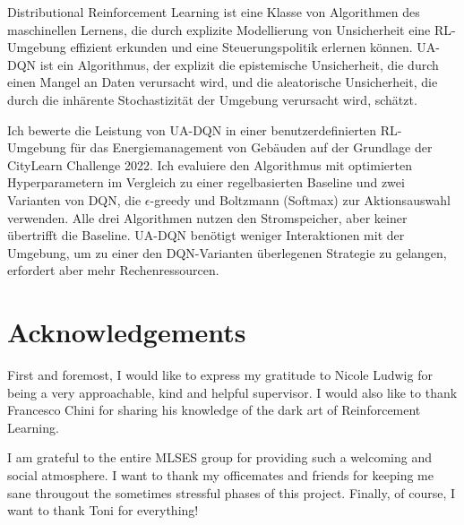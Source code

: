 \documentclass[oneside,12pt,a4paper]{report}
\begin{document}
Distributional Reinforcement Learning ist eine Klasse von Algorithmen des maschinellen Lernens, die durch explizite Modellierung von Unsicherheit eine RL-Umgebung effizient erkunden und eine Steuerungspolitik erlernen können.
UA-DQN ist ein Algorithmus, der explizit die epistemische Unsicherheit, die durch einen Mangel an Daten verursacht wird, und die aleatorische Unsicherheit, die durch die inhärente Stochastizität der Umgebung verursacht wird, schätzt.

Ich bewerte die Leistung von UA-DQN in einer benutzerdefinierten RL-Umgebung für das Energiemanagement von Gebäuden auf der Grundlage der CityLearn Challenge 2022.
Ich evaluiere den Algorithmus mit optimierten Hyperparametern im Vergleich zu einer regelbasierten Baseline und zwei Varianten von DQN, die $\epsilon$-greedy und Boltzmann (Softmax) zur Aktionsauswahl verwenden.
Alle drei Algorithmen nutzen den Stromspeicher, aber keiner übertrifft die Baseline.
UA-DQN benötigt weniger Interaktionen mit der Umgebung, um zu einer den DQN-Varianten überlegenen Strategie zu gelangen, erfordert aber mehr Rechenressourcen.

\newpage
\section*{Acknowledgements}
First and foremost, I would like to express my gratitude to Nicole Ludwig for being a very approachable, kind and helpful supervisor.
I would also like to thank Francesco Chini for sharing his knowledge of the dark art of Reinforcement Learning.

I am grateful to the entire MLSES group for providing such a welcoming and social atmosphere.
I want to thank my officemates and friends for keeping me sane througout the sometimes stressful phases of this project.
Finally, of course, I want to thank Toni for everything!

\cleardoublepage


\renewcommand{\baselinestretch}{1.3}
\small\normalsize

\tableofcontents

\renewcommand{\baselinestretch}{1}
\small\normalsize

\cleardoublepage

\end{document}
